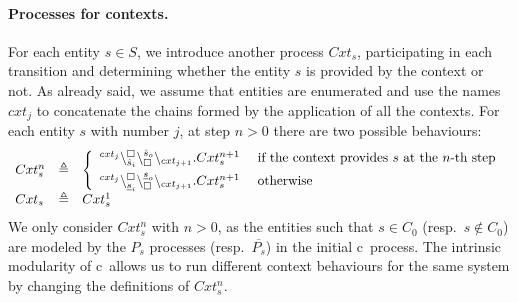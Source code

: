\paragraph{Processes for contexts.}
For each entity $s \in S$, we introduce another process $Cxt_s$,  participating in each transition and determining whether the entity $s$ is provided by the context or not.
As already said, we assume that entities are enumerated and use the names $cxt_j$ to concatenate
the chains formed by the application of all the contexts. 
For each entity $s$ with number $j$, at step $n >0$  there are two possible behaviours: 
\[
\begin{array}{lcl}
Cxt_{s}^n &\triangleq &
\left \{\begin{array}{ll}
 {}^{cxt_j}\backslash_{\hat{s}_i}^{\scriptstyle {\square}}\backslash_{\scriptstyle {\square}}^{\hat{s}_o}\backslash_{cxt_{j+1}}. Cxt_{s}^{n+1} & \ \mbox{if the context provides $s$  at the $n$-th step}\\[5pt] 
 {}^{cxt_j}\backslash_{\underline{s}_i}^{\scriptstyle {\square}}\backslash_{\scriptstyle {\square}}^{\underline{s}_o}\backslash_{cxt_{j+1}}.Cxt_s^{n+1} & \ \mbox{otherwise}
\end{array}\right.\\
Cxt_s & \triangleq & Cxt_s^1\\
\end{array}
\]
We only consider $Cxt_s^n$ with $n >0$, as the entities such that $s \in C_0$ (resp.\ $s\not\in C_0$) are modeled by the $P_s$ processes (resp.\ $\overline{P_s}$) in the initial c\CNA  \ process. 
The intrinsic modularity of c\CNA \ allows us to run different context behaviours
 for the same system by changing the definitions of $Cxt_s^n$.





